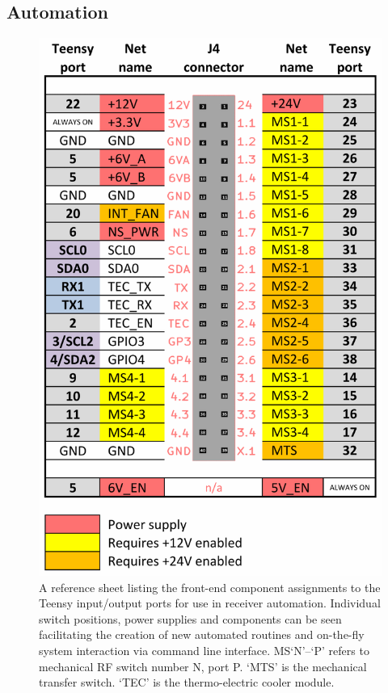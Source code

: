\subsection{Automation}
\begin{figure}
    \centering
    \includegraphics{controller_pinout}
    \caption{A reference sheet listing the front-end component assignments to the Teensy input/output ports for use in receiver automation. Individual switch positions, power supplies and components can be seen facilitating the creation of new automated routines and on-the-fly system interaction via command line interface. MS‘N’--‘P’ refers to mechanical RF switch number N, port P. ‘MTS’ is the mechanical transfer switch. ‘TEC’ is the thermo-electric cooler module.}
    \label{fig:enter-label}
\end{figure}
